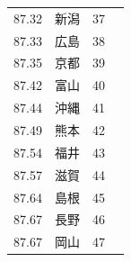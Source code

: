 \begin{table}[ht]
\begin{tabular}{rrlr}
 87.32 & 新潟 &  37 \\
 87.33 & 広島 &  38 \\
 87.35 & 京都 &  39 \\
 87.42 & 富山 &  40 \\
 87.44 & 沖縄 &  41 \\
 87.49 & 熊本 &  42 \\
 87.54 & 福井 &  43 \\
 87.57 & 滋賀 &  44 \\
 87.64 & 島根 &  45 \\
 87.67 & 長野 &  46 \\
 87.67 & 岡山 &  47 \\
   \hline
\end{tabular}
\end{table}






